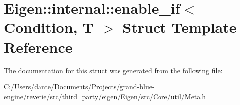 \hypertarget{struct_eigen_1_1internal_1_1enable__if}{}\section{Eigen\+::internal\+::enable\+\_\+if$<$ Condition, T $>$ Struct Template Reference}
\label{struct_eigen_1_1internal_1_1enable__if}


The documentation for this struct was generated from the following file\+:\begin{DoxyCompactItemize}
\item 
C\+:/\+Users/dante/\+Documents/\+Projects/grand-\/blue-\/engine/reverie/src/third\+\_\+party/eigen/\+Eigen/src/\+Core/util/Meta.\+h\end{DoxyCompactItemize}
